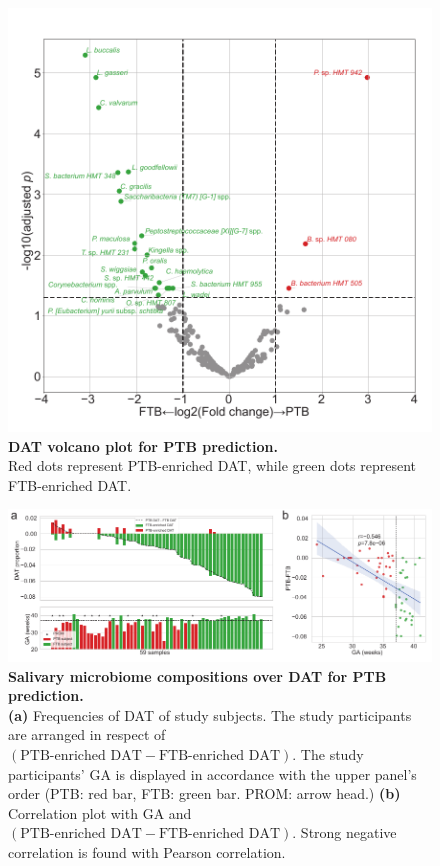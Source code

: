\documentclass[11pt, a4paper, onecolumn, oneside]{report}
\begin{document}
            \begin{figure}[p]
                \centering
                \includegraphics[width=\linewidth]{Figures/PTB/Fig1-DAT.pdf}
                \caption[DAT volcano plot for PTB prediction]{\textbf{DAT volcano plot for PTB prediction.} \\
                    Red dots represent PTB-enriched DAT, while green dots represent FTB-enriched DAT.}
                \label{fig:PTB-DAT}
            \end{figure}
            \clearpage

            \begin{figure}[p]
                \centering
                \includegraphics[width=\linewidth]{Figures/PTB/Fig2-Composition.pdf}
                \caption[Salivary microbiome compositions over DAT for PTB prediction]{\textbf{Salivary microbiome compositions over DAT for PTB prediction.}\\
                    \textbf{(a)} Frequencies of DAT of study subjects. The study participants are arranged in respect of $(\textrm{PTB-enriched DAT} - \textrm{FTB-enriched DAT})$. The study participants' GA is displayed in accordance with the upper panel's order (PTB: red bar, FTB: green bar. PROM: arrow head.) \textbf{(b)} Correlation plot with GA and $(\textrm{PTB-enriched DAT} - \textrm{FTB-enriched DAT})$. Strong negative correlation is found with Pearson correlation.}
                \label{fig:PTB-composition}
            \end{figure}
            \clearpage
\end{document}
